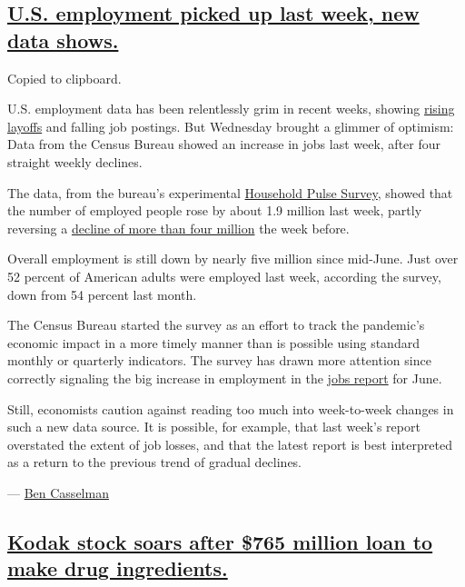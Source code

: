 \hypertarget{us-employment-picked-up-last-week-new-data-shows}{%
\subsection{\texorpdfstring{\protect\hyperlink{us-employment-picked-up-last-week-new-data-shows}{U.S.
employment picked up last week, new data
shows.}}{U.S. employment picked up last week, new data shows.}}\label{us-employment-picked-up-last-week-new-data-shows}}

Copied to clipboard.

U.S. employment data has been relentlessly grim in recent weeks, showing
\href{https://www.nytimes.com/2020/07/23/business/economy/unemployment-economy-coronavirus.html}{rising
layoffs} and falling job postings. But Wednesday brought a glimmer of
optimism: Data from the Census Bureau showed an increase in jobs last
week, after four straight weekly declines.

The data, from the bureau's experimental
\href{https://www.census.gov/programs-surveys/household-pulse-survey/data.html}{Household
Pulse Survey}, showed that the number of employed people rose by about
1.9 million last week, partly reversing a
\href{https://www.nytimes.com/live/2020/07/22/business/stock-market-today-coronavirus/us-employment-has-declined-sharply-a-new-report-shows}{decline
of more than four million} the week before.

Overall employment is still down by nearly five million since mid-June.
Just over 52 percent of American adults were employed last week,
according the survey, down from 54 percent last month.

The Census Bureau started the survey as an effort to track the
pandemic's economic impact in a more timely manner than is possible
using standard monthly or quarterly indicators. The survey has drawn
more attention since correctly signaling the big increase in employment
in the
\href{https://www.nytimes.com/2020/07/02/business/economy/jobs-unemployment-coronavirus.html}{jobs
report} for June.

Still, economists caution against reading too much into week-to-week
changes in such a new data source. It is possible, for example, that
last week's report overstated the extent of job losses, and that the
latest report is best interpreted as a return to the previous trend of
gradual declines.

--- \href{https://www.nytimes.com/by/ben-casselman}{Ben Casselman}

\hypertarget{kodak-stock-soars-after-765-million-loan-to-make-drug-ingredients}{%
\subsection{\texorpdfstring{\protect\hyperlink{kodak-stock-soars-after-765-million-loan-to-make-drug-ingredients}{Kodak
stock soars after \$765 million loan to make drug
ingredients.}}{Kodak stock soars after \$765 million loan to make drug ingredients.}}\label{kodak-stock-soars-after-765-million-loan-to-make-drug-ingredients}}

